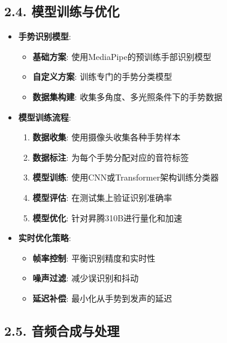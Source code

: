\subsection{2.4.
模型训练与优化}\label{ux6a21ux578bux8badux7ec3ux4e0eux4f18ux5316}

\begin{itemize}
\tightlist
\item
  \textbf{手势识别模型}:

  \begin{itemize}
  \tightlist
  \item
    \textbf{基础方案}: 使用MediaPipe的预训练手部识别模型
  \item
    \textbf{自定义方案}: 训练专门的手势分类模型
  \item
    \textbf{数据集构建}: 收集多角度、多光照条件下的手势数据
  \end{itemize}
\item
  \textbf{模型训练流程}:

  \begin{enumerate}
  \def\labelenumi{\arabic{enumi}.}
  \tightlist
  \item
    \textbf{数据收集}: 使用摄像头收集各种手势样本
  \item
    \textbf{数据标注}: 为每个手势分配对应的音符标签
  \item
    \textbf{模型训练}: 使用CNN或Transformer架构训练分类器
  \item
    \textbf{模型评估}: 在测试集上验证识别准确率
  \item
    \textbf{模型优化}: 针对昇腾310B进行量化和加速
  \end{enumerate}
\item
  \textbf{实时优化策略}:

  \begin{itemize}
  \tightlist
  \item
    \textbf{帧率控制}: 平衡识别精度和实时性
  \item
    \textbf{噪声过滤}: 减少误识别和抖动
  \item
    \textbf{延迟补偿}: 最小化从手势到发声的延迟
  \end{itemize}
\end{itemize}

\subsection{2.5.
音频合成与处理}\label{ux97f3ux9891ux5408ux6210ux4e0eux5904ux7406}

